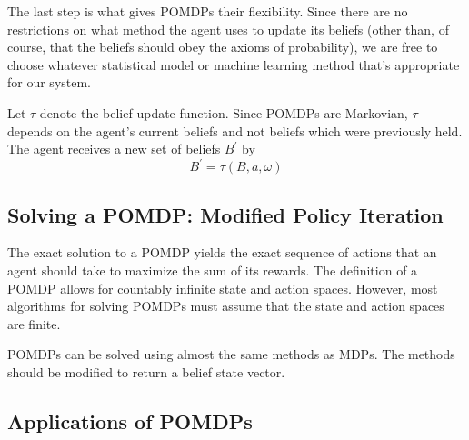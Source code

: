 \documentclass[tog]{acmsiggraph}
\begin{document}
The last step is what gives POMDPs their flexibility. Since there are no restrictions on what method 
the agent uses to update its beliefs (other than, of course, that the beliefs should obey the axioms 
of probability), we are free to choose whatever statistical model or machine learning method that's 
appropriate for our system.

Let $\tau$ denote the belief update function. Since POMDPs are Markovian, $\tau$ depends on the 
agent's current beliefs and not beliefs which were previously held. The agent receives a new set 
of beliefs $B^\prime$ by
\begin{equation*}
  B^\prime = \tau \left( B, a, \omega \right)
\end{equation*}

\subsection{Solving a POMDP: Modified Policy Iteration}

The exact solution to a POMDP yields the exact sequence of actions that an agent should take 
to maximize the sum of its rewards. The definition of a POMDP allows for countably infinite 
state and action spaces. However, most algorithms for solving POMDPs must assume that the 
state and action spaces are finite.

POMDPs can be solved using almost the same methods as MDPs. 
The methods should be modified to return a belief state vector.

\subsection{Applications of POMDPs}




\nocite{*}

\end{document}

